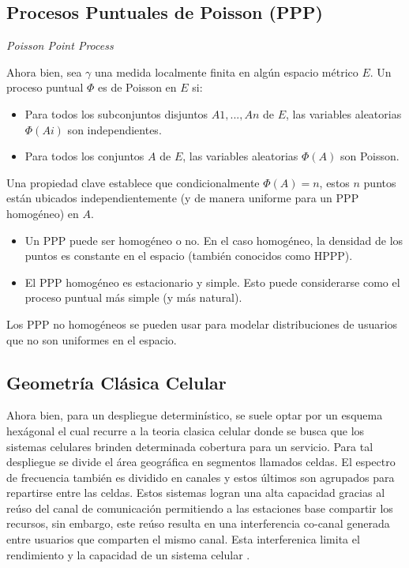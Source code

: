 \subsection{Procesos Puntuales de Poisson (PPP)}\label{PPP_C4}
\textit{Poisson Point Process} \parencite{Haenggi2009}\newline

Ahora bien, sea $\gamma$ una medida localmente finita en algún espacio métrico $E$. Un proceso puntual $\Phi $ es de Poisson en $E$ si:

\begin{itemize}
    \item Para todos los subconjuntos disjuntos $A1, ..., An$ de $E$, las variables aleatorias $\Phi(Ai)$ son independientes.
    \item Para todos los conjuntos $A$ de $E$, las variables aleatorias $\Phi(A)$ son Poisson.
\end{itemize}

Una propiedad clave establece que condicionalmente $\Phi(A)= n$, estos $n$ puntos están ubicados independientemente (y de manera uniforme para un PPP homogéneo) en $A$.\newline

\begin{itemize}
    \item Un PPP puede ser homogéneo o no. En el caso homogéneo, la densidad de los puntos es constante en el espacio (también conocidos como HPPP).
    \item El PPP homogéneo es estacionario y simple. Esto puede considerarse como el proceso puntual más simple (y más natural).
\end{itemize}

Los PPP no homogéneos se pueden usar para modelar distribuciones de usuarios que no son uniformes en el espacio. \newline


\subsection{Geometría Clásica Celular}

Ahora bien, para un despliegue determinístico, se suele optar por un esquema hexágonal el cual recurre a la teoria clasica celular donde se busca que los sistemas celulares brinden determinada cobertura para un servicio. Para tal despliegue se divide el área geográfica en segmentos llamados celdas. El espectro de frecuencia también es dividido en canales y estos últimos son agrupados para repartirse entre las celdas. Estos sistemas logran una alta capacidad gracias al reúso del canal de comunicación permitiendo a las estaciones base compartir los recursos, sin embargo, este reúso resulta en una interferencia co-canal generada  entre usuarios que comparten el mismo canal. Esta interferenica limita el rendimiento y la capacidad de un sistema celular \parencite{Tranter2003}. \newline

